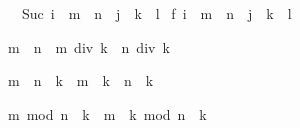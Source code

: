 \begin{isabellebody}
\begin{isamarkuptxt}
\begin{isabelle}
\ {}{}\ Suc\ {}i\ {}\ {}m\ {}\ n\ {}\ j\ {}\ {}k\ {}\ l{}{}{}\ {}\isanewline
{}f\ {}i\ {}\ {}m\ {}\ n\ {}\ j\ {}\ {}k\ {}\ l{}{}{}%
\end{isabelle}%
\end{isamarkuptxt}%
\isamarkuptrue%
\isamarkupfalse%
%
\endisatagproof
{\isafoldproof}%
%
\isadelimproof
%
\endisadelimproof
%
\begin{isamarkuptext}%
\begin{isabelle}%
m\ {}\ n\ {}\ m\ div\ k\ {}\ n\ div\ k%
\end{isabelle}

\begin{isabelle}%
{}m\ {}\ n{}\ {}\ k\ {}\ m\ {}\ k\ {}\ n\ {}\ k%
\end{isabelle}

\begin{isabelle}%
m\ mod\ n\ {}\ k\ {}\ m\ {}\ k\ mod\ {}n\ {}\ k{}%
\end{isabelle}


\end{isamarkuptext}
\end{isabellebody}
